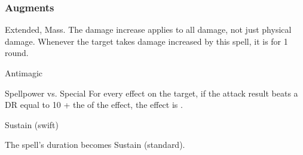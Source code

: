 \subsubsection{Augments}
 Extended, Mass.
The damage increase applies to all damage, not just physical damage.
Whenever the target takes damage increased by this spell, it is  for 1 round.
\begin{spellsection}{Antimagic}
\begin{spellcontent}
\begin{spelltargetinginfo}
\end{spelltargetinginfo}
\begin{spelleffects}
\begin{spellattack}{Spellpower vs. Special}
\spellspecial
For every  effect on the target, if the attack result beats a DR equal to 10 + the  of the effect, the effect is .
\end{spellattack}
\spelldur Sustain (swift)
\end{spelleffects}
\end{spellcontent}
\begin{spellfooter}
\miscastexplode
\end{spellfooter}
\begin{spellcantrip}
The spell's duration becomes Sustain (standard).
\end{spellcantrip}
\end{spellsection}
